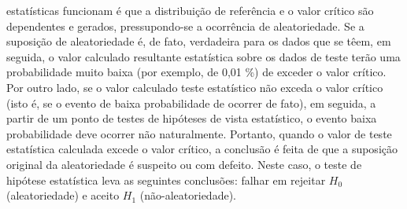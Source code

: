 estatísticas funcionam é que a distribuição de referência e o valor crítico são dependentes e gerados, pressupondo-se a ocorrência de aleatoriedade. Se a suposição de aleatoriedade é, de fato, verdadeira para os dados que se têem, em seguida, o valor calculado resultante estatística sobre os dados de teste terão uma probabilidade muito baixa (por exemplo, de 0,01 \%) de exceder o valor crítico. Por outro lado, se o valor calculado teste estatístico não exceda o valor crítico (isto é, se o evento de baixa probabilidade de ocorrer de fato), em seguida, a partir de um ponto de testes de hipóteses de vista estatístico, o evento baixa probabilidade deve ocorrer não naturalmente. Portanto, quando o valor de teste estatística calculada excede o valor crítico, a conclusão é feita de que a suposição original da aleatoriedade é suspeito ou com defeito. Neste caso, o teste de hipótese estatística leva as seguintes conclusões: falhar em rejeitar $H_0$ (aleatoriedade) e aceito $H_1$ (não-aleatoriedade).
%   
